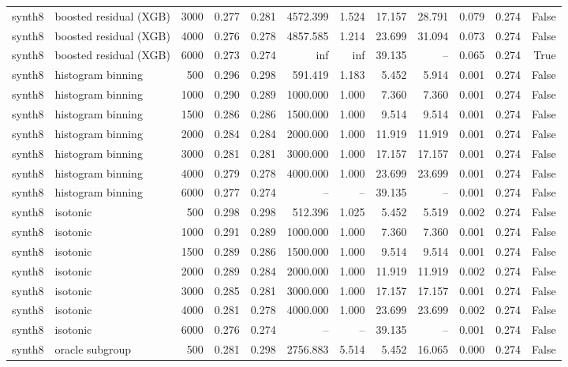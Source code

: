 \begin{tabular}{llrrrrrrrrrr}
synth8 & boosted residual (XGB) & 3000 & 0.277 & 0.281 & 4572.399 & 1.524 & 17.157 & 28.791 & 0.079 & 0.274 & False \\
synth8 & boosted residual (XGB) & 4000 & 0.276 & 0.278 & 4857.585 & 1.214 & 23.699 & 31.094 & 0.073 & 0.274 & False \\
synth8 & boosted residual (XGB) & 6000 & 0.273 & 0.274 & inf & inf & 39.135 & -- & 0.065 & 0.274 & True \\
synth8 & histogram binning & 500 & 0.296 & 0.298 & 591.419 & 1.183 & 5.452 & 5.914 & 0.001 & 0.274 & False \\
synth8 & histogram binning & 1000 & 0.290 & 0.289 & 1000.000 & 1.000 & 7.360 & 7.360 & 0.001 & 0.274 & False \\
synth8 & histogram binning & 1500 & 0.286 & 0.286 & 1500.000 & 1.000 & 9.514 & 9.514 & 0.001 & 0.274 & False \\
synth8 & histogram binning & 2000 & 0.284 & 0.284 & 2000.000 & 1.000 & 11.919 & 11.919 & 0.001 & 0.274 & False \\
synth8 & histogram binning & 3000 & 0.281 & 0.281 & 3000.000 & 1.000 & 17.157 & 17.157 & 0.001 & 0.274 & False \\
synth8 & histogram binning & 4000 & 0.279 & 0.278 & 4000.000 & 1.000 & 23.699 & 23.699 & 0.001 & 0.274 & False \\
synth8 & histogram binning & 6000 & 0.277 & 0.274 & -- & -- & 39.135 & -- & 0.001 & 0.274 & False \\
synth8 & isotonic & 500 & 0.298 & 0.298 & 512.396 & 1.025 & 5.452 & 5.519 & 0.002 & 0.274 & False \\
synth8 & isotonic & 1000 & 0.291 & 0.289 & 1000.000 & 1.000 & 7.360 & 7.360 & 0.001 & 0.274 & False \\
synth8 & isotonic & 1500 & 0.289 & 0.286 & 1500.000 & 1.000 & 9.514 & 9.514 & 0.001 & 0.274 & False \\
synth8 & isotonic & 2000 & 0.289 & 0.284 & 2000.000 & 1.000 & 11.919 & 11.919 & 0.002 & 0.274 & False \\
synth8 & isotonic & 3000 & 0.285 & 0.281 & 3000.000 & 1.000 & 17.157 & 17.157 & 0.001 & 0.274 & False \\
synth8 & isotonic & 4000 & 0.281 & 0.278 & 4000.000 & 1.000 & 23.699 & 23.699 & 0.002 & 0.274 & False \\
synth8 & isotonic & 6000 & 0.276 & 0.274 & -- & -- & 39.135 & -- & 0.001 & 0.274 & False \\
synth8 & oracle subgroup & 500 & 0.281 & 0.298 & 2756.883 & 5.514 & 5.452 & 16.065 & 0.000 & 0.274 & False \\

\end{tabular}

